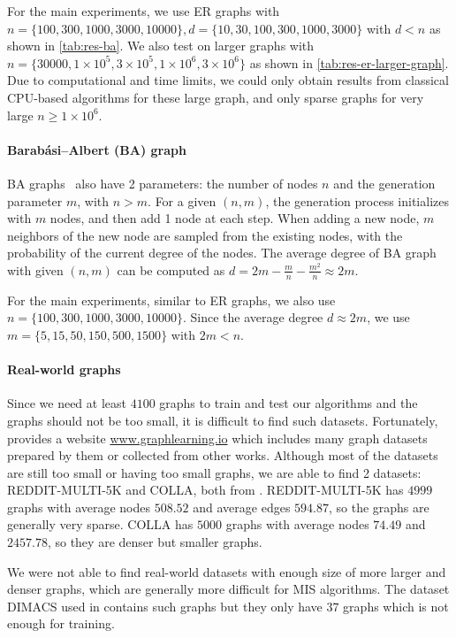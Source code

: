 For the main experiments, we use ER graphs with $n = \{100, 300, 1000, 3000, 10000\}, d = \{10, 30, 100, 300, 1000, 3000\}$ with $d < n$ as shown in \cref{tab:res-ba}. We also test on larger graphs with $n = \{30000, 1\times 10^5, 3\times 10^5, 1\times 10^6, 3 \times 10^6\}$ as shown in \cref{tab:res-er-larger-graph}. Due to computational and time limits, we could only obtain results from classical CPU-based algorithms for these large graph, and only sparse graphs for very large $n \geq 1\times 10^6$.

\paragraph{Barab\'asi–Albert (BA) graph}
BA graphs~\citep{albert2002statistical} also have 2 parameters: the number of nodes $n$ and the generation parameter $m$, with $n > m$. For a given $(n,m)$, the generation process initializes with $m$ nodes, and then add 1 node at each step. When adding a new node, $m$ neighbors of the new node are sampled from the existing nodes, with the probability of the current degree of the nodes. The average degree of BA graph with given $(n,m)$ can be computed as $d = 2m - \frac{m}{n}-\frac{m^2}{n} \approx 2m$.

For the main experiments, similar to ER graphs, we also use $n = \{100, 300, 1000, 3000, 10000\}$. Since the average degree $d \approx 2m$, we use $m=\{5, 15, 50, 150, 500, 1500\}$ with $2m < n$.

\paragraph{Real-world graphs}
Since we need at least $4100$ graphs to train and test our algorithms and the graphs should not be too small, it is difficult to find such datasets. Fortunately, \citet{Morris+2020} provides a website \url{www.graphlearning.io} which includes many graph datasets prepared by them or collected from other works. Although most of the datasets are still too small or having too small graphs, we are able to find 2 datasets: REDDIT-MULTI-5K and COLLA, both from \citet{yanardag2015deep}. REDDIT-MULTI-5K has $4999$ graphs with average nodes $508.52$ and average edges $594.87$, so the graphs are generally very sparse. COLLA has $5000$ graphs with average nodes $74.49$ and $2457.78$, so they are denser but smaller graphs.

We were not able to find real-world datasets with enough size of more larger and denser graphs, which are generally more difficult for MIS algorithms. The dataset DIMACS used in \citet{boether_dltreesearch_2022} contains such graphs but they only have $37$ graphs which is not enough for training.

